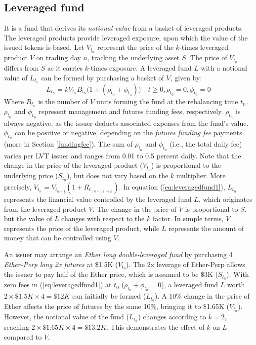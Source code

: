 \subsection{Leveraged fund}\label{subsec:leveragedfund}
It is a fund that derives its \textsl{notional value} from a basket of leveraged products. The leveraged products provide leveraged exposure, upon which the value of the issued tokens is based. Let $V_{t_{n}}$ represent the price of the $k$-times leveraged product $V$ on trading day $n$, tracking the underlying asset $S$. The price of $V_{t_{n}}$ differs from $S$ as it carries $k$-times exposure. A leveraged fund $L$ with a notional value of $L_{t_{n}}$ can be formed by purchasing a basket of $V$, given by:
\begin{equation}\label{eq:leveragedfund1}
	L_{t_{n}}=kV_{t_{n}}B_{t_{n}}\big(1+(\rho_{t_{n}}+\phi_{t_{n}})\big)\quad t \ge 0, \rho_{t_{0}}=0, \phi_{t_{0}}=0
\end{equation}
Where $B_{t_{n}}$ is the number of $V$ units forming the fund at the rebalancing time $t_{n}$. $\rho_{t_{n}}$ and $\phi_{t_{n}}$ represent management and futures funding fees, respectively. $\rho_{t_{n}}$ is always negative, as the issuer deducts associated expenses from the fund's value. $\phi_{t_{n}}$ can be positive or negative, depending on the \textsl{futures funding fee} payments (more in Section \ref{fundingfee}). The sum of $\rho_{t_{n}}$ and $\phi_{t_{n}}$ (i.e., the total daily fee) varies per LVT issuer and ranges from 0.01 to 0.5 percent daily. Note that the change in the price of the leveraged product ($V_{t_{n}}$) is proportional to the underlying price ($S_{t_{n}}$), but does not vary based on the $k$ multiplier. More precisely, $V_{t_{n}} = V_{t_{n-1}}(1+R_{t_{(n-1)\to n}})$. In equation (\ref{eq:leveragedfund1}), $L_{t_{n}}$ represents the financial value controlled by the leveraged fund $L$, which originates from the leveraged product $V$. The change in the price of $V$ is proportional to $S$, but the value of $L$ changes with respect to the $k$ factor. In simple terms, $V$ represents the price of the leveraged product, while $L$ represents the amount of money that can be controlled using $V$.
\begin{example}\label{ex:eth2l_1}
	An issuer may arrange an \textsl{Ether long double-leveraged fund} by purchasing 4 \textsl{Ether-Perp long 2x futures} at \$1.5K ($V_{t_{0}}$). The 2x leverage of Ether-Perp allows the issuer to pay half of the Ether price, which is assumed to be \$3K ($S_{t_{0}}$). With zero fees in (\ref{eq:leveragedfund1}) at $t_{0}$ ($\rho_{t_{0}}+\phi_{t_{0}}=0$), a leveraged fund $L$ worth $2\times{\$1.5K}\times{4}=\$12K$ can initially be formed ($L_{t_{0}}$). A 10\% change in the price of Ether affects the price of futures by the same 10\%, bringing it to \$1.65K ($V_{t_{n}}$). However, the notional value of the fund ($L_{t_{n}}$) changes according to $k=2$, reaching $2\times{\$1.65K}\times{4}=\$13.2K$. This demonstrates the effect of $k$ on $L$ compared to $V$.
\end{example}

